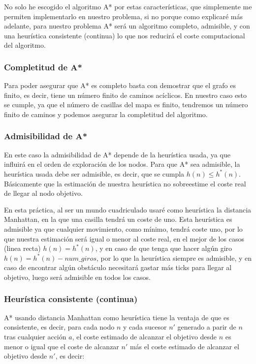 \documentclass[10pt, spanish]{article}
\begin{document}
No solo he escogido el algoritmo A* por estas características, que simplemente me permiten implementarlo en nuestro problema, si no porque como explicaré más adelante, para nuestro problema A* será un algoritmo completo, admisible, y con una heurística consistente (continua) lo que nos reducirá el coste computacional del algoritmo.

\subsubsection{Completitud de A*}

Para poder asegurar que A* es completo basta con demostrar que el grafo es finito, es decir, tiene un número finito de caminos acíclicos. En nuestro caso esto se cumple, ya que el número de casillas del mapa es finito, tendremos un número finito de caminos y podemos asegurar la completitud del algoritmo.

\subsubsection{Admisibilidad de A*}

En este caso la admisibilidad de A* depende de la heurística usada, ya que influirá en el orden de exploración de los nodos. Para que A* sea admisible, la heurística usada debe ser admisible, es decir, que se cumpla $h(n) \leq h^*(n)$. Básicamente que la estimación de nuestra heurística no sobreestime el coste real de llegar al nodo objetivo.

En esta práctica, al ser un mundo cuadriculado usaré como heurística la distancia Manhattan, en la que una casilla tendrá un coste de uno. Esta heurística es admisible ya que cualquier movimiento, como mínimo, tendrá coste uno, por lo que nuestra estimación será igual o menor al coste real, en el mejor de los casos (linea recta) $h(n) = h^*(n)$, y en caso de que tenga que hacer algún giro $h(n) = h^*(n) - num\_giros$, por lo que la heurística siempre es admisible, y en caso de encontrar algún obstáculo necesitará gastar más ticks para llegar al objetivo, luego será admisible en todos los casos.

\subsubsection{Heurística consistente (continua)}

A* usando distancia Manhattan como heurística tiene la ventaja de que es consistente, es decir, para cada nodo $n$ y cada sucesor $n'$ generado a parir de $n$ tras cualquier acción $a$, el coste estimado de alcanzar el objetivo desde $n$ es menor o igual que el coste de alcanzar $n'$ más el coste estimado de alcanzar el objetivo desde $n'$, es decir:
\end{document}
